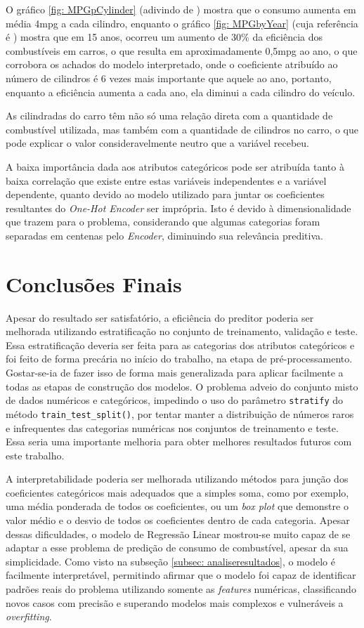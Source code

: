 \documentclass{report}
\let\oldsection\section
\renewcommand\section{\clearpage\oldsection}
\begin{document}
O gráfico \ref{fig: MPGpCylinder} (adivindo de \cite{CylinderXMPG}) mostra que o consumo aumenta em média 4mpg a cada cilindro, enquanto o gráfico \ref{fig: MPGbyYear}
(cuja referência é \cite{YearXMPG}) mostra que em 15 anos, ocorreu um aumento de 30\% da eficiência dos combustíveis em carros, o que resulta em aproximadamente 0,5mpg ao ano,
o que corrobora os achados do modelo interpretado, onde o coeficiente atribuído ao número de cilindros é 6 vezes mais importante que aquele ao ano,
portanto, enquanto a eficiência aumenta a cada ano, ela diminui a cada cilindro do veículo.

As cilindradas do carro têm não só uma relação direta com a quantidade de combustível utilizada, mas também com a quantidade de cilindros no carro,
o que pode explicar o valor consideravelmente neutro que a variável recebeu.

A baixa importância dada aos atributos categóricos pode ser atribuída tanto à baixa correlação que existe entre estas variáveis independentes e a
variável dependente, quanto devido ao modelo utilizado para juntar os coeficientes resultantes do \textit{One-Hot Encoder} ser imprópria. Isto é devido à
dimensionalidade que trazem para o problema, considerando que algumas categorias foram separadas em centenas pelo \textit{Encoder}, diminuindo sua relevância preditiva.

\section{Conclusões Finais}
Apesar do resultado ser satisfatório, a eficiência do preditor poderia ser melhorada utilizando estratificação no conjunto de treinamento, validação e teste. Essa estratificação
deveria ser feita para as categorias dos atributos categóricos e foi feito de forma precária no início do trabalho, na etapa de pré-processamento. Gostar-se-ia de fazer isso de forma
mais generalizada para aplicar facilmente a todas as etapas de construção dos modelos. O problema adveio do conjunto misto de dados numéricos e categóricos, impedindo o uso do parâmetro
\texttt{stratify} do método \texttt{train\_test\_split()}, por tentar manter a distribuição de números raros e infrequentes das categorias numéricas nos conjuntos de treinamento e teste.
Essa seria uma importante melhoria para obter melhores resultados futuros com este trabalho.

A interpretabilidade poderia ser melhorada utilizando métodos para junção dos coeficientes categóricos mais adequados que a simples soma, como por exemplo, uma média ponderada de todos os
coeficientes, ou um \textit{box plot} que demonstre o valor médio e o desvio de todos os coeficientes dentro de cada categoria. Apesar dessas dificuldades, o modelo de Regressão Linear
mostrou-se muito capaz de se adaptar a esse problema de predição de consumo de combustível, apesar da sua simplicidade. Como visto na subseção \ref{subsec: analiseresultados}, o modelo
é facilmente interpretável, permitindo afirmar que o modelo foi capaz de identificar padrões reais do problema utilizando somente as \textit{features} numéricas, classificando novos casos
com precisão e superando modelos mais complexos e vulneráveis a \textit{overfitting}.
\end{document}
